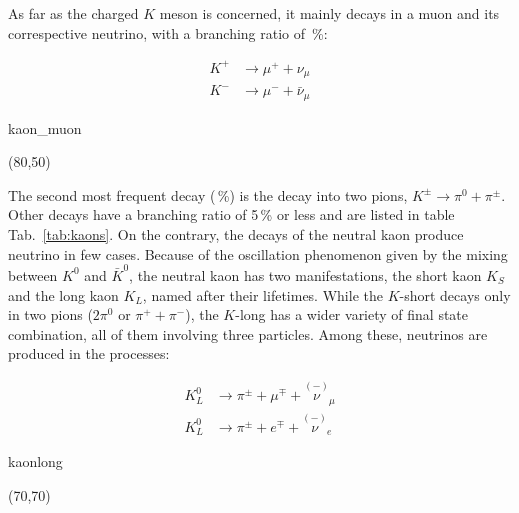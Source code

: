 As far as the charged $K$ meson is concerned, it mainly decays in a muon and its correspective neutrino, %
with a branching ratio of \,\%:

\begin{minipage}[c][3cm][c]{0.5\textwidth}
	\centering
	\begin{align}
		K^+ &\rightarrow \mu^+ + \nu_\mu \\
		K^- &\rightarrow \mu^- + \bar{\nu}_\mu
	\end{align}
\end{minipage}
%
\begin{minipage}[c][3cm][c]{0.5\textwidth}
	\centering
	\begin{fmffile}{kaon_muon}
		\begin{fmfgraph*}(80,50)
		\end{fmfgraph*}
	\end{fmffile}
\end{minipage}

The second most frequent decay (\,\%) is the decay into two pions, $K^{\pm} \rightarrow \pi^0 + \pi^\pm$.
Other decays have a branching ratio of 5\,\% or less and are listed in table Tab.~\ref{tab:kaons}.
On the contrary, the decays of the neutral kaon produce neutrino in few cases.
Because of the oscillation phenomenon given by the mixing between $K^0$ and $\bar K^0$, the neutral kaon has two %
manifestations, the short kaon $K_S$ and the long kaon $K_L$, named after their lifetimes.
While the $K$-short decays only in two pions ($2 \pi^0$ or $\pi^+ + \pi^-$), the $K$-long has a wider variety %
of final state combination, all of them involving three particles.
Among these, neutrinos are produced in the processes:

\begin{minipage}[c][3cm][c]{0.5\textwidth}
	\centering
	\begin{align}
		K^0_L &\rightarrow \pi^\pm + \mu^\mp + \overset{(-)}{\nu}_\mu \\
		K^0_L &\rightarrow \pi^\pm + e^\mp + \overset{(-)}{\nu}_e 
	\end{align}
\end{minipage}
%
\begin{minipage}[c][3cm][c]{0.5\textwidth}
	\centering
	\begin{fmffile}{kaonlong}
		\begin{fmfgraph*}(70,70)
		\end{fmfgraph*}
	\end{fmffile}
\end{minipage}

